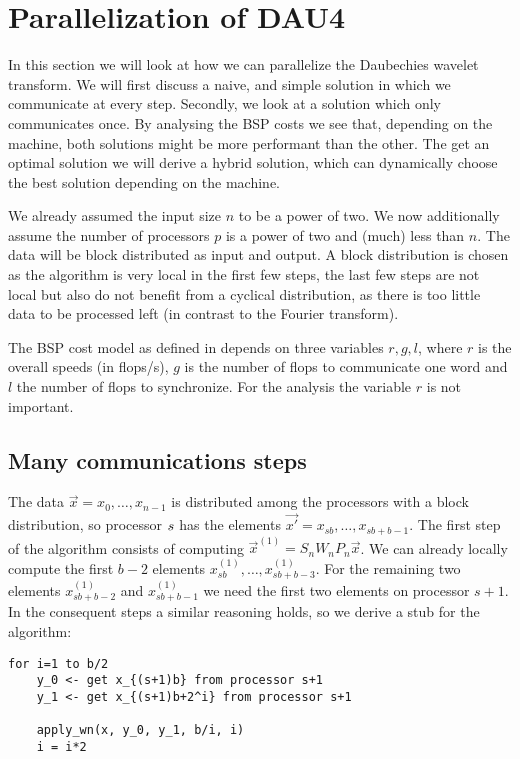 
\section{Parallelization of DAU4}
\label{sec:par}

In this section we will look at how we can parallelize the Daubechies wavelet transform. We will first discuss a naive, and simple solution in which we communicate at every step. Secondly, we look at a solution which only communicates once. By analysing the BSP costs we see that, depending on the machine, both solutions might be more performant than the other. The get an optimal solution we will derive a hybrid solution, which can dynamically choose the best solution depending on the machine.

We already assumed the input size $n$ to be a power of two. We now additionally assume the number of processors $p$ is a power of two and (much) less than $n$. The data will be block distributed as input and output. A block distribution is chosen as the algorithm is very local in the first few steps, the last few steps are not local but also do not benefit from a cyclical distribution, as there is too little data to be processed left (in contrast to the Fourier transform).

The BSP cost model as defined in \cite{biss} depends on three variables $r, g, l$, where $r$ is the overall speeds (in flops/s), $g$ is the number of flops to communicate one word and $l$ the number of flops to synchronize. For the analysis the variable $r$ is not important.

\subsection{Many communications steps}
The data $\vec{x} = x_0, \ldots, x_{n-1}$ is distributed among the processors with a block distribution, so processor $s$ has the elements $\vec{x'} = x_{sb}, \ldots, x_{sb+b-1}$. The first step of the algorithm consists of computing $\vec{x}^{(1)} = S_n W_n P_n \vec{x}$. We can already locally compute the first $b-2$ elements $x^{(1)}_{sb}, \ldots, x^{(1)}_{sb+b-3}$. For the remaining two elements $x^{(1)}_{sb+b-2}$ and $x^{(1)}_{sb+b-1}$ we need the first two elements on processor $s+1$. In the consequent steps a similar reasoning holds, so we derive a stub for the algorithm:

\begin{lstlisting}
for i=1 to b/2
	y_0 <- get x_{(s+1)b} from processor s+1
	y_1 <- get x_{(s+1)b+2^i} from processor s+1

	apply_wn(x, y_0, y_1, b/i, i)
	i = i*2
\end{lstlisting}

